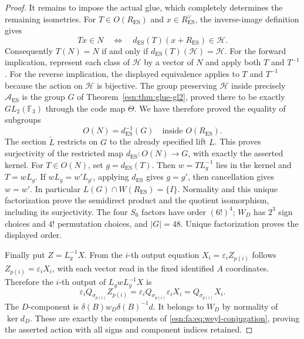 \begin{proof}
It remains to impose the actual glue, which completely determines the
remaining isometries.  For \(T\in O(R_{\mathrm{ES}})\) and
\(x\in R_{\mathrm{ES}}^\vee\), the inverse-image definition gives
\[
 Tx\in N
 \quad\Longleftrightarrow\quad
 d_{\mathrm{ES}}(T)(x+R_{\mathrm{ES}})\in\mathcal H.
\]
Consequently \(T(N)=N\) if and only if
\(d_{\mathrm{ES}}(T)(\mathcal H)=\mathcal H\).
For the forward implication, represent each class of \(\mathcal H\)
by a vector of \(N\) and apply both \(T\) and \(T^{-1}\).
For the reverse implication, the displayed equivalence applies to
\(T\) and \(T^{-1}\) because the action on \(\mathcal H\) is
bijective.  The group preserving \(\mathcal H\) inside precisely
\(\mathcal A_{\mathrm{ES}}\) is the group \(G\) of
Theorem~\ref{esn:thm:glue-gl2}, proved there to be exactly
\(GL_2(\mathbb F_3)\) through the code map \(\Theta\).
We have therefore proved the equality of subgroups
\[
 O(N)=d_{\mathrm{ES}}^{-1}(G)
                          \quad\text{inside }O(R_{\mathrm{ES}}).
\]
The section \(\widetilde L\) restricts on \(G\) to the already
specified lift \(L\).  This proves surjectivity of the restricted
map \(d_{\mathrm{ES}}:O(N)\to G\), with exactly the asserted kernel.
For \(T\in O(N)\), set \(g=d_{\mathrm{ES}}(T)\).
Then \(w=TL_g^{-1}\) lies in the kernel and \(T=wL_g\).
If \(wL_g=w'L_{g'}\), applying \(d_{\mathrm{ES}}\) gives
\(g=g'\), then cancellation gives \(w=w'\).
In particular \(L(G)\cap W(R_{\mathrm{ES}})=\{I\}\).
Normality and this unique factorization prove the semidirect product
and the quotient isomorphism, including its surjectivity.
The four \(S_6\) factors have order \((6!)^4\);
\(W_D\) has \(2^3\) sign choices and \(4!\) permutation choices,
and \(|G|=48\).  Unique factorization proves the displayed order.

Finally put \(Z=L_g^{-1}X\).  From the \(i\)-th output equation
\(X_i=\varepsilon_iZ_{p(i)}\) follows
\(Z_{p(i)}=\varepsilon_iX_i\), with each vector read in the fixed
identified \(A\) coordinates.  Therefore the \(i\)-th output of
\(L_gwL_g^{-1}X\) is
\[
 \varepsilon_iQ_{\sigma_{p(i)}}Z_{p(i)}
   =\varepsilon_iQ_{\sigma_{p(i)}}\varepsilon_iX_i
   =Q_{\sigma_{p(i)}}X_i.
\]
The \(D\)-component is
\(\delta(B)w_D\delta(B)^{-1}d\).
It belongs to \(W_D\) by normality of \(\ker d_D\).
These are exactly the components of
\eqref{esn:fa:eq:weyl-conjugation}, proving the asserted action with
all signs and component indices retained.
\end{proof}

